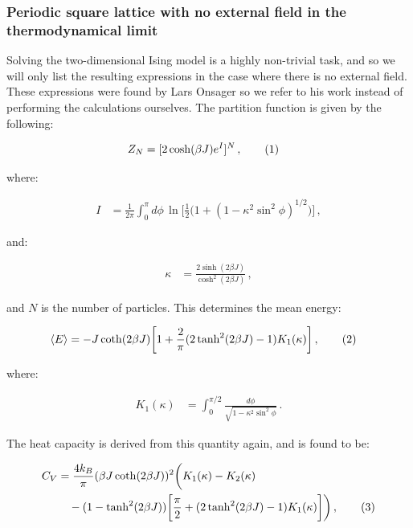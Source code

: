 \documentclass[reprint,english,notitlepage]{revtex4-1}  %
\newcommand\numberthis{\addtocounter{equation}{1}\tag{\theequation}}
\begin{document}
\subsubsection{Periodic square lattice with no external field in the thermodynamical limit} \label{sec:II:A:ii}

Solving the two-dimensional Ising model is a highly non-trivial task, and so we will only list the resulting expressions in the case where there is no external field. These expressions were found by Lars Onsager so we refer to his work \citep{L.Onsager1944} instead of performing the calculations ourselves. The partition function is given by the following:

\begin{align*}
Z_N &= [2\cosh(\beta J) e^I ]^N \, , \numberthis \label{eq:LO_partition_function}
\end{align*}

where: 

\begin{align*}
I &= \frac{1}{2\pi} \int_0^\pi d\phi \, \ln \bigg[\frac{1}{2}\bigg( 1 + ( 1 - \kappa^2 \sin^2 \phi)^{1/2} \bigg) \bigg] \, , 
\end{align*}

and:

\begin{align*}
\kappa &= \frac{2\sinh ( 2\beta J) }{\cosh^2(2\beta J)} \, ,
\end{align*}

and $N$ is the number of particles. This determines the mean energy:

\begin{align*}
\langle E \rangle &= -J \coth( 2\beta J) \bigg[ 1 + \frac{2}{\pi} (2\tanh^2 (2\beta J) - 1) K_1(\kappa) \bigg] \, , \numberthis \label{eq:LO_energy}
\end{align*}

where:

\begin{align*}
K_1 (\kappa) &= \int_0^{\pi/2} \frac{d\phi}{\sqrt{1 - \kappa^2 \sin^2 \phi}} \, .
\end{align*}

The heat capacity is derived from this quantity again, and is found to be:

\begin{align*}
C_V &= \frac{4k_B}{\pi} (\beta J \coth(2\beta J))^2 \bigg( K_1(\kappa) - K_2(\kappa) \\ 
& \quad - (1 - \tanh^2 (2\beta J) ) \bigg[ \frac{\pi}{2} + (2\tanh^2 (2\beta J) - 1)K_1(\kappa) \bigg] \bigg) \, , \numberthis \label{eq:LO_heat_capacity}
\end{align*}
\end{document}
